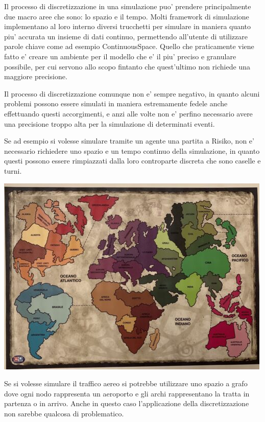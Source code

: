 Il processo di discretizzazione in una simulazione puo' prendere 
principalmente due macro aree che sono: lo spazio e il tempo. 
Molti framework di simulazione implementano al loro interno 
diversi trucchetti per simulare in maniera quanto piu' accurata
un insieme di dati continuo, permettendo all'utente di utilizzare
parole chiave come ad esempio ContinuousSpace. Quello che praticamente
viene fatto e' creare un ambiente per il modello che e' il piu'
preciso e granulare possibile, per cui servono allo scopo fintanto
che quest'ultimo non richiede una maggiore precisione. 

Il processo di discretizzazione comunque non e' sempre negativo, 
in quanto alcuni problemi possono essere simulati in maniera 
estremamente fedele anche effettuando questi accorgimenti, e anzi
alle volte non e' perfino necessario avere una precisione troppo 
alta per la simulazione di determinati eventi.

Se ad esempio si volesse simulare tramite un agente una partita 
a Risiko, non e' necessario richiedere uno spazio e un tempo continuo
della simulazione, in quanto questi possono essere rimpiazzati 
dalla loro controparte discreta che sono caselle e turni. 

\begin{minipage}{\linewidth}
    \centering
    \includegraphics[scale=0.5]{img/s-l500.jpg}
    \label{fig:risiko}
\end{minipage}

Se si volesse simulare il traffico aereo si potrebbe utilizzare
uno spazio a grafo dove ogni nodo rappresenta un aeroporto e 
gli archi rappresentano la tratta in partenza o in arrivo. Anche in 
questo caso l'applicazione della discretizzazione non sarebbe 
qualcosa di problematico.